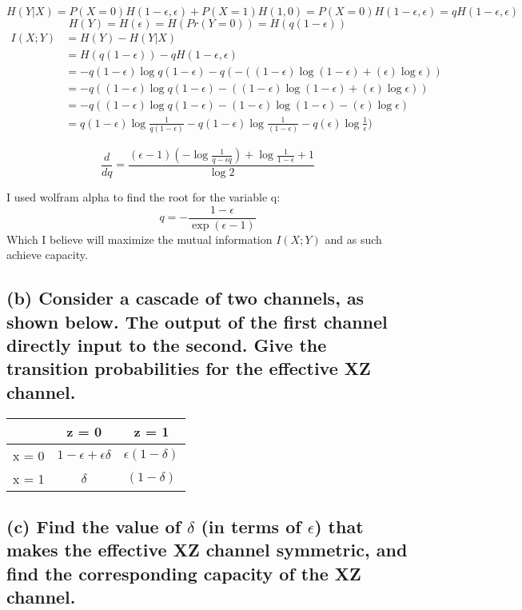\documentclass[11pt, oneside]{book}   	%
\begin{document}
$$H(Y|X)=P(X=0)H(1-\epsilon, \epsilon) + P(X=1)H(1,0) = P(X=0)H(1-\epsilon, \epsilon) = qH(1-\epsilon, \epsilon)$$
$$H(Y)=H(\epsilon)=H(Pr(Y=0))=H(q(1-\epsilon))$$
\begin{equation}
\begin{split}
I(X;Y) & =H(Y)-H(Y|X) \\
& = H(q(1-\epsilon)) - qH(1-\epsilon,\epsilon) \\
& = - q(1-\epsilon)\log{q(1-\epsilon)} - q(- ( (1-\epsilon)\log{(1-\epsilon)} + (\epsilon)\log{\epsilon})) \\
& = -q ( (1-\epsilon)\log{q(1-\epsilon)} - ( (1-\epsilon)\log{(1-\epsilon)} + (\epsilon)\log{\epsilon} ) ) \\
& = -q ( (1-\epsilon)\log{q(1-\epsilon)} - (1-\epsilon)\log{(1-\epsilon)} - (\epsilon)\log{\epsilon} ) \\
& = q(1-\epsilon)\log{\frac{1}{q(1-\epsilon)}} - q(1-\epsilon)\log{\frac{1}{(1-\epsilon)}} - q(\epsilon)\log{\frac{1}{\epsilon}} )
\end{split}
\end{equation}

$$\frac{d}{dq} = \frac{(\epsilon-1)(-\log{\frac{1}{q-\epsilon q}}) + \log{\frac{1}{1-\epsilon}} +1}{\log{2}}$$

I used wolfram alpha to find the root for the variable q:
$$q = -\frac{1-\epsilon}{\exp(\epsilon - 1)}$$
Which I believe will maximize the mutual information $I(X;Y)$ and as such achieve capacity.

\subsection*{(b) Consider a cascade of two channels, as shown below.  The output of the first channel directly input to the second.  Give the transition probabilities for the effective XZ channel.}

\begin{tabular}{c || c | c |}
  & z = 0 & z = 1 \\
  \hline
  x = 0 & $1-\epsilon+\epsilon \delta$ & $\epsilon(1-\delta)$ \\
  x = 1 & $\delta$ & $(1-\delta)$ \\
  \hline
\end{tabular}

\subsection*{(c) Find the value of $\delta$ (in terms of $\epsilon$) that makes the effective XZ channel symmetric, and find the corresponding capacity of the XZ channel.}
\end{document}
